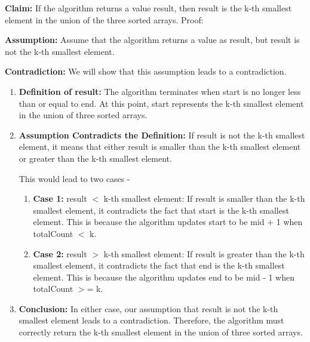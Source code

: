 \documentclass[8pt]{article}
\begin{document}
\vspace{0.5em}

\textbf{Claim:} If the algorithm returns a value result, then result is the k-th smallest element in the union of the three sorted arrays.
\vspace{0.5em}
Proof:

\textbf{Assumption:} Assume that the algorithm returns a value as result, but result is not the k-th smallest element.
\vspace{0.5em}

\textbf{Contradiction:} We will show that this assumption leads to a contradiction.

\begin{enumerate}
        \item \textbf{Definition of result:} The algorithm terminates when start is no longer less than or equal to end. At this point, start represents the k-th smallest element in the union of three sorted arrays.
        \item \textbf{Assumption Contradicts the Definition:} If result is not the k-th smallest element, it means that either result is smaller than the k-th smallest element or greater than the k-th smallest element.

        \vspace{0.5em}

        This would lead to two cases - 

        \begin{enumerate}
            \item \textbf{Case 1:} result $<$ k-th smallest element: If result is smaller than the k-th smallest element, it contradicts the fact that start is the k-th smallest element. This is because the algorithm updates start to be mid + 1 when totalCount $<$ k.
            \item \textbf{Case 2:} result $>$ k-th smallest element: If result is greater than the k-th smallest element, it contradicts the fact that end is the k-th smallest element. This is because the algorithm updates end to be mid - 1 when totalCount $>$= k.
        \end{enumerate}

        \item \textbf{Conclusion:} In either case, our assumption that result is not the k-th smallest element leads to a contradiction. Therefore, the algorithm must correctly return the k-th smallest element in the union of three sorted arrays.

\end{enumerate}
\end{document}
